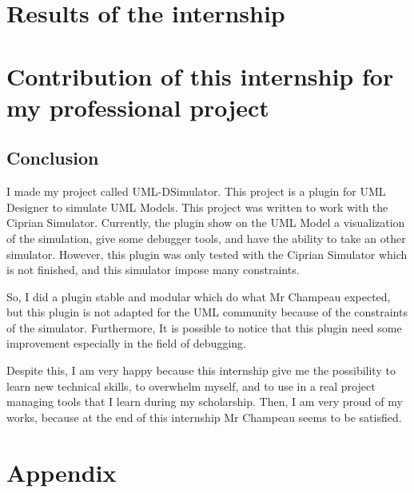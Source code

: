 \documentclass[a4paper, 11pt, oneside, oldfontcommands]{memoir}
\newcounter{th}[chapter]
\newcommand{\umld}{UML Designer\xspace}
\begin{document}




\part{Results of the internship}






% 


\part{Contribution of this internship for my professional project}



\chapter*{Conclusion}

I made my project called UML-DSimulator. This project is a plugin for \umld to simulate UML Models.
This project was written to work with the Ciprian Simulator. Currently, the plugin show on the UML Model a visualization of the simulation, give some debugger tools, and have the ability to take an other simulator. However, this plugin was only tested with the Ciprian Simulator which is not finished, and this simulator impose many constraints. %

So, I did a plugin stable and modular which do what Mr Champeau expected, but this plugin is not adapted for the UML community because of the constraints of the simulator. Furthermore, It is possible to notice that this plugin need some improvement especially in the field of debugging.

Despite this, I am very happy because this internship give me the possibility to learn new technical skills, to overwhelm myself, and to use in a real project managing tools that I learn during my scholarship. Then, I am very proud of my works, because at the end of this internship Mr Champeau seems to be satisfied.
\newpage

\part*{Appendix}
\appendix



%
% 

\nocite{*}
%
\newpage
~\\
\newpage
 \listoffigures
 \printindex
 
  
\end{document}
